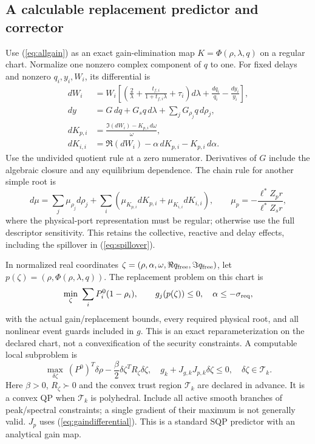 \documentclass[11pt]{article}
\begin{document}
\subsection{A calculable replacement predictor and corrector}
Use (\ref{eq:allgain}) as an exact gain-elimination map
$K=\Phi(\rho,\lambda,q)$ on a regular chart. Normalize one nonzero
complex component of $q$ to one. For fixed delays and nonzero
$q_i,y_i,W_i$, its differential is
\begin{align}
 dW_i&=W_i\left[
 \left(\frac2\lambda+\frac{t_{f,i}}{1+t_{f,i}\lambda}+\tau_i\right)d\lambda
 +\frac{dq_i}{q_i}-\frac{dy_i}{y_i}\right],\\
 dy&=G\,dq+G_s q\,d\lambda+
             \sum_jG_{\rho_j}q\,d\rho_j,\\
 dK_{p,i}&=\frac{\Im(dW_i)-K_{p,i}\,d\omega}{\omega},\\
 dK_{i,i}&=\Re(dW_i)-\alpha\,dK_{p,i}-K_{p,i}\,d\alpha .
 \label{eq:gaindifferential}
\end{align}
Use the undivided quotient rule at a zero numerator. Derivatives of
$G$ include the algebraic closure and any equilibrium dependence.
The chain rule for another simple root is
\[
 d\mu=\sum_j\mu_{\rho_j}d\rho_j+
 \sum_i(\mu_{K_{p,i}}dK_{p,i}+\mu_{K_{i,i}}dK_{i,i}),
 \qquad
 \mu_p=-\frac{\ell^*Z_p r}{\ell^*Z_s r},
\]
where the physical-port representation must be regular; otherwise
use the full descriptor sensitivity. This retains the collective,
reactive and delay effects, including the spillover in
(\ref{eq:spillover}).

In normalized real coordinates
$\zeta=(\rho,\alpha,\omega,\Re q_{\rm free},\Im q_{\rm free})$, let
$p(\zeta)=(\rho,\Phi(\rho,\lambda,q))$.
The replacement problem on this chart is
\[
 \min_\zeta\ \sum_iP_i^0(1-\rho_i),\qquad
 g_j(p(\zeta))\le0,\quad \alpha\le-\sigma_{\rm req},
\]
with the actual gain/replacement bounds, every required physical root,
and all nonlinear event guards included in $g$. This is an exact
reparameterization on the declared chart, not a convexification of
the security constraints. A computable local subproblem is
\begin{equation}
 \max_{\delta\zeta}\ (P^0)^T\delta\rho
       -\frac{\beta}{2}\delta\zeta^T R_\zeta\delta\zeta,\quad
 g_k+J_{g,k}J_{p,k}\delta\zeta\le0,\quad
 \delta\zeta\in\mathcal T_k . \label{eq:closureQP}
\end{equation}
Here $\beta>0$, $R_\zeta\succ0$ and the convex trust region
$\mathcal T_k$ are declared in advance. It is a convex QP when
$\mathcal T_k$ is polyhedral. Include all active smooth branches of
peak/spectral constraints; a single gradient of their maximum is
not generally valid. $J_p$ uses (\ref{eq:gaindifferential}).
This is a standard SQP predictor with an analytical gain map.
\end{document}
